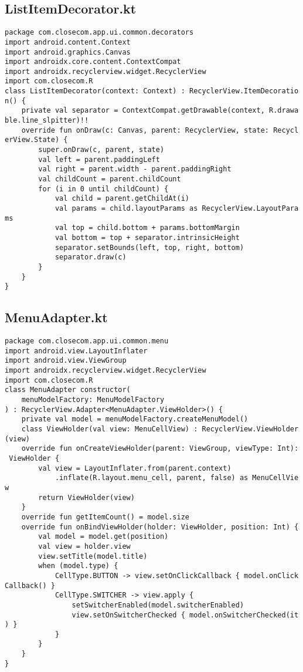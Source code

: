 \documentclass[listing]{espd}
\begin{document}
\subsection{ListItemDecorator.kt}
\begin{verbatim}
package com.closecom.app.ui.common.decorators
import android.content.Context
import android.graphics.Canvas
import androidx.core.content.ContextCompat
import androidx.recyclerview.widget.RecyclerView
import com.closecom.R
class ListItemDecorator(context: Context) : RecyclerView.ItemDecoratio
n() {
    private val separator = ContextCompat.getDrawable(context, R.drawa
ble.line_slpitter)!!
    override fun onDraw(c: Canvas, parent: RecyclerView, state: Recycl
erView.State) {
        super.onDraw(c, parent, state)
        val left = parent.paddingLeft
        val right = parent.width - parent.paddingRight
        val childCount = parent.childCount
        for (i in 0 until childCount) {
            val child = parent.getChildAt(i)
            val params = child.layoutParams as RecyclerView.LayoutPara
ms
            val top = child.bottom + params.bottomMargin
            val bottom = top + separator.intrinsicHeight
            separator.setBounds(left, top, right, bottom)
            separator.draw(c)
        }
    }
}
\end{verbatim}

\subsection{MenuAdapter.kt}
\begin{verbatim}
package com.closecom.app.ui.common.menu
import android.view.LayoutInflater
import android.view.ViewGroup
import androidx.recyclerview.widget.RecyclerView
import com.closecom.R
class MenuAdapter constructor(
    menuModelFactory: MenuModelFactory
) : RecyclerView.Adapter<MenuAdapter.ViewHolder>() {
    private val model = menuModelFactory.createMenuModel()
    class ViewHolder(val view: MenuCellView) : RecyclerView.ViewHolder
(view)
    override fun onCreateViewHolder(parent: ViewGroup, viewType: Int):
 ViewHolder {
        val view = LayoutInflater.from(parent.context)
            .inflate(R.layout.menu_cell, parent, false) as MenuCellVie
w
        return ViewHolder(view)
    }
    override fun getItemCount() = model.size
    override fun onBindViewHolder(holder: ViewHolder, position: Int) {
        val model = model.get(position)
        val view = holder.view
        view.setTitle(model.title)
        when (model.type) {
            CellType.BUTTON -> view.setOnClickCallback { model.onClick
Callback() }
            CellType.SWITCHER -> view.apply {
                setSwitcherEnabled(model.switcherEnabled)
                view.setOnSwitcherChecked { model.onSwitcherChecked(it
) }
            }
        }
    }
}
\end{verbatim}
\end{document}
